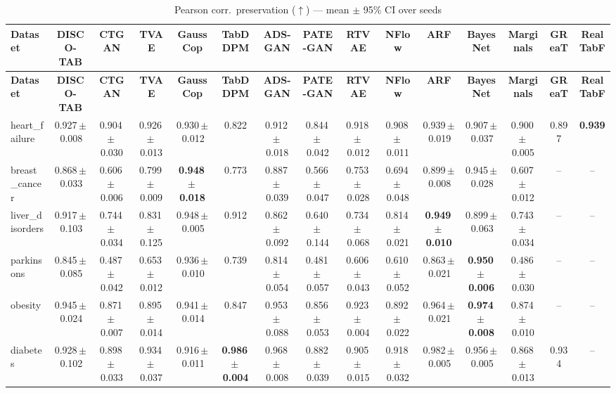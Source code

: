 \documentclass[8pt]{extarticle}
\begin{document}
\begin{longtable}{l*{14}{c}}
\caption{Pearson corr.\ preservation ($\uparrow$) --- mean $\pm$ 95\% CI over seeds}\\
\toprule
\textbf{Dataset} & \textbf{DISCO-TAB} & \textbf{CTGAN} & \textbf{TVAE} & \textbf{GaussCop} & \textbf{TabDDPM} & \textbf{ADS-GAN} & \textbf{PATE-GAN} & \textbf{RTVAE} & \textbf{NFlow} & \textbf{ARF} & \textbf{BayesNet} & \textbf{Marginals} & \textbf{GReaT} & \textbf{RealTabF} \\
\midrule
\endfirsthead
\toprule
\textbf{Dataset} & \textbf{DISCO-TAB} & \textbf{CTGAN} & \textbf{TVAE} & \textbf{GaussCop} & \textbf{TabDDPM} & \textbf{ADS-GAN} & \textbf{PATE-GAN} & \textbf{RTVAE} & \textbf{NFlow} & \textbf{ARF} & \textbf{BayesNet} & \textbf{Marginals} & \textbf{GReaT} & \textbf{RealTabF} \\
\midrule
\endhead
\bottomrule
\endfoot
heart\_failure & 0.927\,$\pm$\,0.008 & 0.904\,$\pm$\,0.030 & 0.926\,$\pm$\,0.013 & 0.930\,$\pm$\,0.012 & 0.822 & 0.912\,$\pm$\,0.018 & 0.844\,$\pm$\,0.042 & 0.918\,$\pm$\,0.012 & 0.908\,$\pm$\,0.011 & 0.939\,$\pm$\,0.019 & 0.907\,$\pm$\,0.037 & 0.900\,$\pm$\,0.005 & 0.897 & \textbf{0.939} \\
breast\_cancer & 0.868\,$\pm$\,0.033 & 0.606\,$\pm$\,0.006 & 0.799\,$\pm$\,0.009 & \textbf{0.948\,$\pm$\,0.018} & 0.773 & 0.887\,$\pm$\,0.039 & 0.566\,$\pm$\,0.047 & 0.753\,$\pm$\,0.028 & 0.694\,$\pm$\,0.048 & 0.899\,$\pm$\,0.008 & 0.945\,$\pm$\,0.028 & 0.607\,$\pm$\,0.012 & -- & -- \\
liver\_disorders & 0.917\,$\pm$\,0.103 & 0.744\,$\pm$\,0.034 & 0.831\,$\pm$\,0.125 & 0.948\,$\pm$\,0.005 & 0.912 & 0.862\,$\pm$\,0.092 & 0.640\,$\pm$\,0.144 & 0.734\,$\pm$\,0.068 & 0.814\,$\pm$\,0.021 & \textbf{0.949\,$\pm$\,0.010} & 0.899\,$\pm$\,0.063 & 0.743\,$\pm$\,0.034 & -- & -- \\
parkinsons & 0.845\,$\pm$\,0.085 & 0.487\,$\pm$\,0.042 & 0.653\,$\pm$\,0.012 & 0.936\,$\pm$\,0.010 & 0.739 & 0.814\,$\pm$\,0.054 & 0.481\,$\pm$\,0.057 & 0.606\,$\pm$\,0.043 & 0.610\,$\pm$\,0.052 & 0.863\,$\pm$\,0.021 & \textbf{0.950\,$\pm$\,0.006} & 0.486\,$\pm$\,0.030 & -- & -- \\
obesity & 0.945\,$\pm$\,0.024 & 0.871\,$\pm$\,0.007 & 0.895\,$\pm$\,0.014 & 0.941\,$\pm$\,0.014 & 0.847 & 0.953\,$\pm$\,0.088 & 0.856\,$\pm$\,0.053 & 0.923\,$\pm$\,0.004 & 0.892\,$\pm$\,0.022 & 0.964\,$\pm$\,0.021 & \textbf{0.974\,$\pm$\,0.008} & 0.874\,$\pm$\,0.010 & -- & -- \\
diabetes & 0.928\,$\pm$\,0.102 & 0.898\,$\pm$\,0.033 & 0.934\,$\pm$\,0.037 & 0.916\,$\pm$\,0.011 & \textbf{0.986\,$\pm$\,0.004} & 0.968\,$\pm$\,0.008 & 0.882\,$\pm$\,0.039 & 0.905\,$\pm$\,0.015 & 0.918\,$\pm$\,0.032 & 0.982\,$\pm$\,0.005 & 0.956\,$\pm$\,0.005 & 0.868\,$\pm$\,0.013 & 0.934 & -- \\

\end{longtable}
\end{document}
